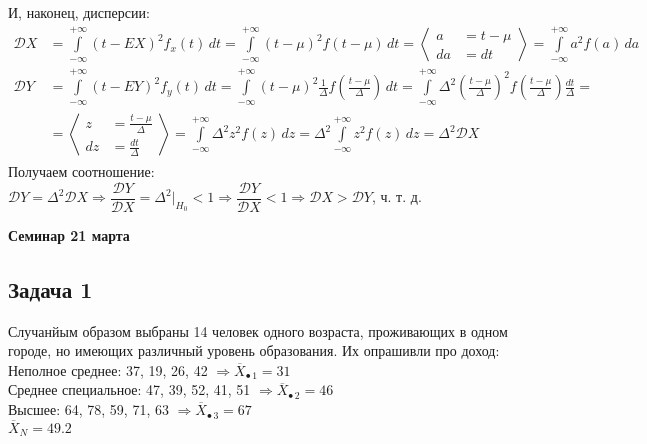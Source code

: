 \documentclass[12pt, a4paper]{article}
\newcommand{\dev}{\mathcal{D}}
\begin{document}
И, наконец, дисперсии:
\begin{equation*}
    \begin{aligned}
        \dev X &= \int\limits_{-\infty}^{+\infty} {\left(t - EX\right)}^2 f_{x}(t)\, dt = \int\limits_{-\infty}^{+\infty} {\left( t - \mu \right)}^2 f(t - \mu)\, dt = \left< \begin{aligned}
            a &= t - \mu\\
            da &= dt
        \end{aligned} \right> = \int\limits_{-\infty}^{+\infty} a^2 f(a)\, da\\
        \dev Y &= \int\limits_{-\infty}^{+\infty} {\left( t - EY\right)}^2 f_{y}(t)\, dt = \int\limits_{-\infty}^{+\infty} {\left( t - \mu \right)}^2 \frac{1}{\Delta} f\left( \frac{t - \mu}{\Delta} \right)\, dt = \int\limits_{-\infty}^{+\infty} \Delta^2{\left( \frac{t - \mu}{\Delta} \right)}^2 f\left( \frac{t - \mu}{\Delta} \right) \frac{dt}{\Delta} = \\
        &= \left< \begin{aligned}
            z &= \frac{t - \mu}{\Delta}\\
            dz &= \frac{dt}{\Delta}
        \end{aligned} \right> = \int\limits_{-\infty}^{+\infty} \Delta^2 z^2 f(z)\, dz = \Delta^2 \int\limits_{-\infty}^{+\infty}  z^2 f(z)\, dz = \Delta^2 \dev X
    \end{aligned}
\end{equation*}
Получаем соотношение: $\dev Y = \Delta^2 \dev X\Rightarrow \dfrac{\dev Y}{\dev X} = \Delta^2\Big|_{H_0} < 1\Rightarrow \dfrac{\dev Y}{\dev X} < 1 \Rightarrow \dev X > \dev Y$, ч. т. д.
\begin{center}
    \bf Семинар 21 марта
\end{center}
\subsection*{Задача 1}
Случанйым образом выбраны 14 человек одного возраста, проживающих в одном городе, но имеющих различный уровень образования. Их опрашивли про доход:\\
Неполное среднее: 37, 19, 26, 42 $\Rightarrow\overline{X}_{\bullet\, 1} = 31$\\
Среднее специальное: 47, 39, 52, 41, 51 $\Rightarrow\overline{X}_{\bullet\, 2} = 46$\\
Высшее: 64, 78, 59, 71, 63 $\Rightarrow\overline{X}_{\bullet\, 3} = 67$\\
$\overline{X}_N = 49.2$\\
\end{document}

